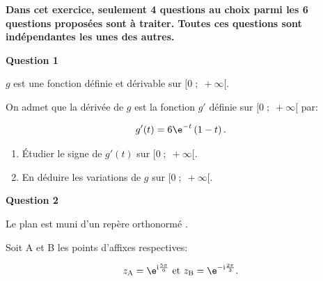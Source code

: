 \medskip

\textbf{Dans cet exercice, seulement 4 questions au choix parmi les 6 questions proposées sont à traiter. Toutes ces questions sont indépendantes les unes des autres.}

\medskip

\textbf{Question 1}

\medskip

$g$ est une fonction définie et dérivable sur $[0\;;\;+\infty[$.

On admet que la dérivée de $g$ est la fonction $g'$ définie sur $[0\;;\;+\infty[$ par: 

\[g'(t)=6\e^{-t}\left (1-t\right ).\]

\begin{enumerate}
\item Étudier le signe de $g'(t)$ sur $[0\;;\;+\infty[$.
\item En déduire les variations de $g$ sur $[0\;;\;+\infty[$.
\end{enumerate}

\bigskip

\textbf{Question 2}

\medskip

Le plan est muni d'un repère orthonormé \Ouv. 

Soit A et B les points d'affixes respectives:

\[z_{\text{A}} = \e^{\text{i} \frac{5\pi}{6}} \text{ et } z_{\text{B}} = \e^{-\text{i} \frac{2\pi}{3}}.\]

